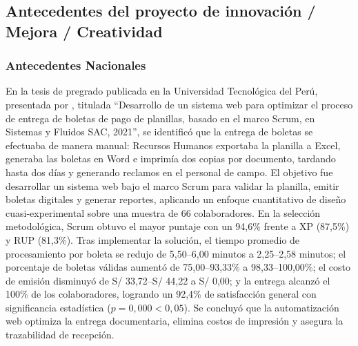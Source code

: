 \subsection{Antecedentes del proyecto de innovación / Mejora / Creatividad}

\subsubsection{Antecedentes Nacionales}

En la tesis de pregrado publicada en la Universidad Tecnológica del Perú, presentada por \textcite{aguilar2022desarrollo}, 
titulada ``Desarrollo de un sistema web para optimizar el proceso de entrega de boletas de pago de planillas, basado en el marco Scrum,
 en Sistemas y Fluidos SAC, 2021'', se identificó que la entrega de boletas se efectuaba de manera manual: Recursos Humanos exportaba la planilla a Excel, 
 generaba las boletas en Word e imprimía dos copias por documento, tardando hasta dos días y generando reclamos en el personal de campo.
 El objetivo fue desarrollar un sistema web bajo el marco Scrum para validar la planilla, emitir boletas digitales y generar reportes, 
 aplicando un enfoque cuantitativo de diseño cuasi-experimental sobre una muestra de 66 colaboradores. En la selección metodológica, 
 Scrum obtuvo el mayor puntaje con un 94,6\% frente a XP (87,5\%) y RUP (81,3\%). Tras implementar la solución, 
 el tiempo promedio de procesamiento por boleta se redujo de 5,50--6,00 minutos a 2,25--2,58 minutos; el porcentaje de boletas válidas aumentó de 75,00--93,33\% a 98,33--100,00\%; 
 el costo de emisión disminuyó de S/ 33,72--S/ 44,22 a S/ 0,00; y la entrega alcanzó el 100\% de los colaboradores, logrando un 92,4\% 
 de satisfacción general con significancia estadística ($p = 0,000 < 0,05$). Se concluyó que la automatización web optimiza la entrega documentaria, 
 elimina costos de impresión y asegura la trazabilidad de recepción.


